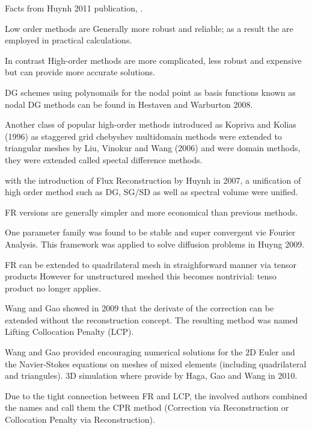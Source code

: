 \begin{frame}[allowframebreaks]
 Facts from Huynh 2011 publication, \cite{Huynh2011}.
 \begin{orangeitemize}
  \item Low order methods are Generally more robust and reliable; as a result the are employed in practical calculations.
  \item In contrast High-order methods are more complicated, less robust and expensive but can provide more accurate solutions.
  \item DG schemes using polynomails for the nodal point as basis functions known as nodal DG methods can be found in Hestaven and Warburton 2008.
  \item Another class of popular high-order methods introduced as Kopriva and Kolias (1996) as staggered grid chebyshev multidomain methods were extended to triangular meshes by Liu, Vinokur and Wang (2006) and were domain methods, they were extended called spectal difference methods. 
  \item with the introduction of Flux Reconstruction by Huynh in 2007, a unification of high order method such as DG, SG/SD as well as spectral volume were unified.
  \item FR versions are generally simpler and more economical than previous methods.
  \item One parameter family was found to be stable and super convergent vie Fourier Analysis. This framework was applied to solve diffusion problems in Huyng 2009.
  \item FR can be extended to quadrilateral mesh in straighforward manner via tensor products However for unstructured meshed this becomes nontrivial: tenso product no longer applies.
  \item Wang and Gao showed in 2009 that the derivate of the correction can be extended without the reconstruction concept. The resulting method was named Lifting Collocation Penalty (LCP).
  \item Wang and Gao provided encouraging numerical solutions for the 2D Euler and the Navier-Stokes equations on meshes of mixed elements (including quadrilateral and triangules). 3D simulation where provide by Haga, Gao and Wang in 2010.
  \item Due to the tight connection between FR and LCP, the involved authors combined the names and call them the CPR method (Correction via Reconstruction or Collocation Penalty via Reconstruction). 
 \end{orangeitemize}  
\end{frame}


